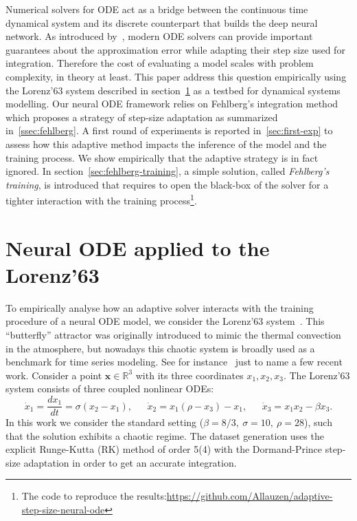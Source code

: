 \documentclass{article}
\newcommand{\R}{\ensuremath{\mathbb{R}}}
\newcommand{\x}{\ensuremath{\mathbf{x}}} %
\begin{document}
Numerical solvers for ODE act as a bridge between the continuous time
dynamical system and its discrete counterpart that builds the deep
neural network. As introduced by~\cite{Chen18NODE}, modern ODE solvers
can provide important guarantees about the approximation error while
adapting their step size used for integration. Therefore the cost of
evaluating a model scales with problem complexity, in theory at
least. This paper address this question empirically using the
Lorenz'63 system described in section~\ref{sec:node} as a testbed for
dynamical systems modelling. Our neural ODE framework relies on
Fehlberg's integration method which proposes a strategy of step-size
adaptation as summarized in~\ref {ssec:fehlberg}. A first round of
experiments is reported in~\ref{sec:first-exp} to assess how this
adaptive method impacts the inference of the model and the training
process. We show empirically that the adaptive strategy is in fact
ignored.  In section~\ref{sec:fehlberg-training}, a simple solution,
called \textit{Fehlberg's training}, is introduced that requires to
open the black-box of the solver for a tighter interaction with the
training process\footnote{The code to reproduce the
  results:\url{https://github.com/Allauzen/adaptive-step-size-neural-ode}}.
 
\section{Neural ODE applied to the Lorenz'63}
\label{sec:node}

To empirically analyse how an adaptive solver interacts with the
training procedure of a neural ODE model, we consider the
Lorenz'63 system~\cite{Lorenz63}. This ``butterfly'' attractor was
originally introduced to mimic the thermal convection in the
atmosphere, but nowadays this chaotic system is broadly used
as a benchmark for time series modeling. See for
instance~\cite{Nassar18Tree,Champion19Data,Greydanus19Hamlitonian,Dubois20Data,Gilpin21Chaos}
just to name a few recent work. Consider a point $\x \in \R^3$ with its three
coordinates $x_1, x_2, x_3$. The Lorenz'63 system consists of three
coupled nonlinear ODEs:
\begin{equation}
  \label{eq:lorenz}
  \dot{x}_1 = \frac{dx_1}{dt} = \sigma (x_2 - x_1),\phantom{5ex}
  \dot{x}_2 = x_1(\rho - x_3) - x_1,\phantom{5ex}
  \dot{x}_3 = x_1x_2 - \beta x_3.
\end{equation}
In this work we consider the standard setting
($\beta = 8/3,\ \sigma = 10,\ \rho = 28$), such that the solution
exhibits a chaotic regime. The dataset generation uses the explicit
Runge-Kutta (RK) method of order 5(4) with the Dormand-Prince
step-size adaptation in order to get an accurate integration.
\end{document}
